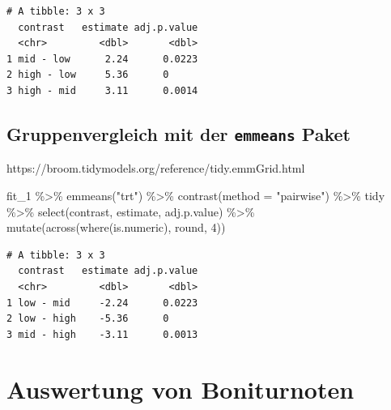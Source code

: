 \documentclass[
  letterpaper,
]{scrbook}
\newenvironment{Shaded}{\begin{snugshade}}{\end{snugshade}}
\newcommand{\AttributeTok}[1]{\textcolor[rgb]{0.40,0.45,0.13}{#1}}
\newcommand{\DecValTok}[1]{\textcolor[rgb]{0.68,0.00,0.00}{#1}}
\newcommand{\FunctionTok}[1]{\textcolor[rgb]{0.28,0.35,0.67}{#1}}
\newcommand{\NormalTok}[1]{\textcolor[rgb]{0.00,0.23,0.31}{#1}}
\newcommand{\SpecialCharTok}[1]{\textcolor[rgb]{0.37,0.37,0.37}{#1}}
\newcommand{\StringTok}[1]{\textcolor[rgb]{0.13,0.47,0.30}{#1}}
\begin{document}
\begin{verbatim}
# A tibble: 3 x 3
  contrast   estimate adj.p.value
  <chr>         <dbl>       <dbl>
1 mid - low      2.24      0.0223
2 high - low     5.36      0     
3 high - mid     3.11      0.0014
\end{verbatim}

\hypertarget{gruppenvergleich-mit-der-emmeans-paket}{%
\subsection{\texorpdfstring{Gruppenvergleich mit der \texttt{emmeans}
Paket}{Gruppenvergleich mit der emmeans Paket}}\label{gruppenvergleich-mit-der-emmeans-paket}}

https://broom.tidymodels.org/reference/tidy.emmGrid.html

\begin{Shaded}
\begin{Highlighting}[]
\NormalTok{fit\_1 }\SpecialCharTok{\%\textgreater{}\%} 
  \FunctionTok{emmeans}\NormalTok{(}\StringTok{"trt"}\NormalTok{) }\SpecialCharTok{\%\textgreater{}\%} 
  \FunctionTok{contrast}\NormalTok{(}\AttributeTok{method =} \StringTok{"pairwise"}\NormalTok{) }\SpecialCharTok{\%\textgreater{}\%} 
\NormalTok{  tidy }\SpecialCharTok{\%\textgreater{}\%} 
  \FunctionTok{select}\NormalTok{(contrast, estimate, adj.p.value) }\SpecialCharTok{\%\textgreater{}\%} 
  \FunctionTok{mutate}\NormalTok{(}\FunctionTok{across}\NormalTok{(}\FunctionTok{where}\NormalTok{(is.numeric), round, }\DecValTok{4}\NormalTok{))}
\end{Highlighting}
\end{Shaded}

\begin{verbatim}
# A tibble: 3 x 3
  contrast   estimate adj.p.value
  <chr>         <dbl>       <dbl>
1 low - mid     -2.24      0.0223
2 low - high    -5.36      0     
3 mid - high    -3.11      0.0013
\end{verbatim}

\hypertarget{auswertung-von-boniturnoten}{%
\section{Auswertung von
Boniturnoten}\label{auswertung-von-boniturnoten}}
\end{document}
